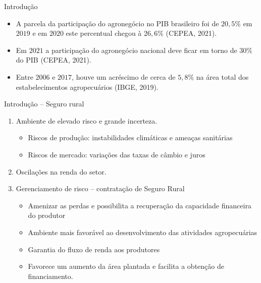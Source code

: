 \documentclass[aspectratio=169]{beamer}
\begin{document}
\begin{frame}{Introdução}
\vspace{0.5cm}
		\begin{itemize}
		    \item A parcela da participação do agronegócio no PIB brasileiro foi de $20,5\%$ em $2019$ e em $2020$ este percentual chegou à $26,6\%$  (CEPEA, 2021).
		    \vspace{0.5cm}
		    \item  Em $2021$ a participação do agronegócio nacional deve ficar em torno de $30\%$ do PIB (CEPEA, 2021).
		    \vspace{0.5cm}
		    \item Entre $2006$ e $2017$, houve um acréscimo de cerca de $5,8\%$ na área total dos estabelecimentos agropecuários (IBGE, 2019).
		\end{itemize}
\end{frame}
\begin{frame}{Introdução -- Seguro rural}
	\begin{enumerate}
		\item Ambiente de elevado risco e grande incerteza.
		\begin{itemize}
		    \item Riscos de produção: instabilidades climáticas e ameaças sanitárias
		    \item Riscos de mercado: variações das taxas de câmbio e juros
		\end{itemize}
		\vspace{0.25cm}
		\item Oscilações na renda do setor.
		\vspace{0.25cm}
		\item Gerenciamento de risco -- contratação de Seguro Rural
		\begin{itemize}
		    \item  Amenizar as perdas e possibilita a recuperação da capacidade financeira do produtor
		    \item Ambiente mais favorável ao desenvolvimento das atividades agropecuárias 
		    \item Garantia do fluxo de renda aos produtores
		    \item Favorece um aumento da área plantada e facilita a obtenção de financiamento.
		\end{itemize}
	\end{enumerate}
\end{frame}
\end{document}
